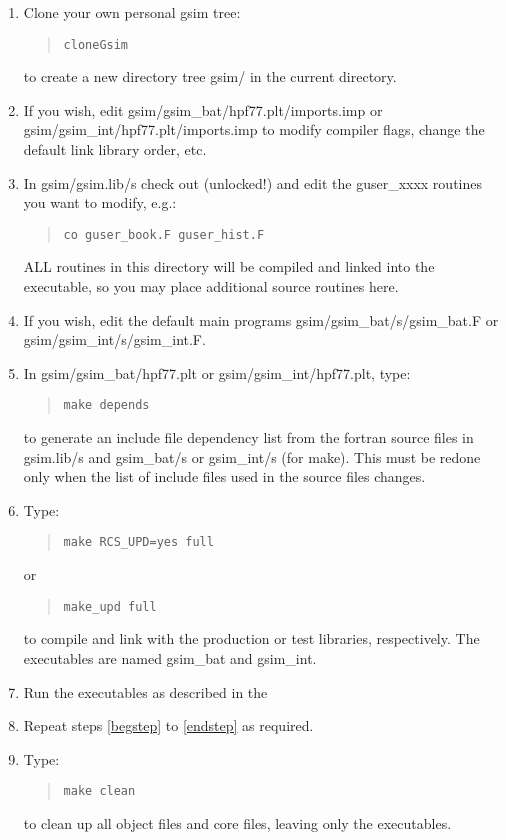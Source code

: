 \documentclass{article}
\begin{document}
\begin{enumerate}

\item Clone your own personal gsim tree:
\begin{quote}
{\tt cloneGsim}
\end{quote}
to create a new directory tree gsim/ in the current directory.

\item If you wish, edit gsim/gsim\_bat/hpf77.plt/imports.imp or
gsim/gsim\_int/hpf77.plt/imports.imp to modify compiler
flags, change the default link library order, etc.

\item In gsim/gsim.lib/s check out (unlocked!) and edit the guser\_xxxx
routines you want to modify, e.g.:
\begin{quote}
{\tt co guser\_book.F guser\_hist.F	}
\end{quote}
ALL routines in this directory will be compiled and linked into the
executable, so you may place additional source routines here.
\label{begstep}

\item If you wish, edit the default main programs gsim/gsim\_bat/s/gsim\_bat.F or
gsim/gsim\_int/s/gsim\_int.F.

\item In gsim/gsim\_bat/hpf77.plt or gsim/gsim\_int/hpf77.plt, type:
\begin{quote}
{\tt make depends}
\end{quote}
to generate an include file dependency list from the fortran source
files in gsim.lib/s and gsim\_bat/s or gsim\_int/s (for make).  This
must be redone only when the list of include files used in the source
files changes.

\item Type:
\begin{quote}
{\tt make RCS\_UPD=yes full}
\end{quote}
or
\begin{quote}
{\tt make\_upd full}
\end{quote}
to compile and link with the production or test libraries,
respectively.  The executables are named gsim\_bat and gsim\_int.

\item Run the executables as described in the %
\label{endstep}

\item Repeat steps \ref{begstep} to \ref{endstep} as required.

\item Type:
\begin{quote}
{\tt make clean}
\end{quote}
to clean up all object files and core files, leaving only the executables.

\end{enumerate}
\end{document}
